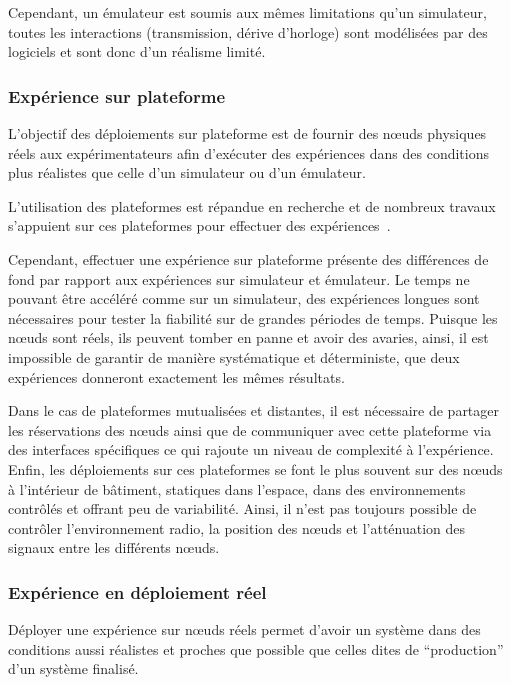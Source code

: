 Cependant, un émulateur est soumis aux mêmes limitations qu'un simulateur, toutes les interactions (transmission, dérive d'horloge) sont modélisées par des logiciels et sont donc d'un réalisme limité.

\subsubsection{Expérience sur plateforme}
\label{makesense:testbeds}

L'objectif des déploiements sur plateforme est de fournir des nœuds physiques réels aux expérimentateurs afin d'exécuter des expériences dans des conditions plus réalistes que celle d'un simulateur ou d'un émulateur.

L'utilisation des plateformes est répandue en recherche et de nombreux travaux s'appuient sur ces plateformes pour effectuer des expériences~\cite{handziski2006twist}.

Cependant, effectuer une expérience sur plateforme présente des différences de fond par rapport aux expériences sur simulateur et émulateur.
Le temps ne pouvant être accéléré comme sur un simulateur, des expériences longues sont nécessaires pour tester la fiabilité sur de grandes périodes de temps.
Puisque les nœuds sont réels, ils peuvent tomber en panne et avoir des avaries, ainsi, il est impossible de garantir de manière systématique et déterministe, que deux expériences donneront exactement les mêmes résultats. 

Dans le cas de plateformes mutualisées et distantes, il est nécessaire de partager les réservations des nœuds ainsi que de communiquer avec cette plateforme via des interfaces spécifiques ce qui rajoute un niveau de complexité à l'expérience.
Enfin, les déploiements sur ces plateformes se font le plus souvent sur des nœuds à l'intérieur de bâtiment, statiques dans l'espace, dans des environnements contrôlés et offrant peu de variabilité.
Ainsi, il n'est pas toujours possible de contrôler l'environnement radio, la position des nœuds et l'atténuation des signaux entre les différents nœuds. 

\subsubsection{Expérience en déploiement réel}
\label{makesense:real_deployment}

Déployer une expérience sur nœuds réels permet d'avoir un système dans des conditions aussi réalistes et proches que possible que celles dites de ``production'' d'un système finalisé.


